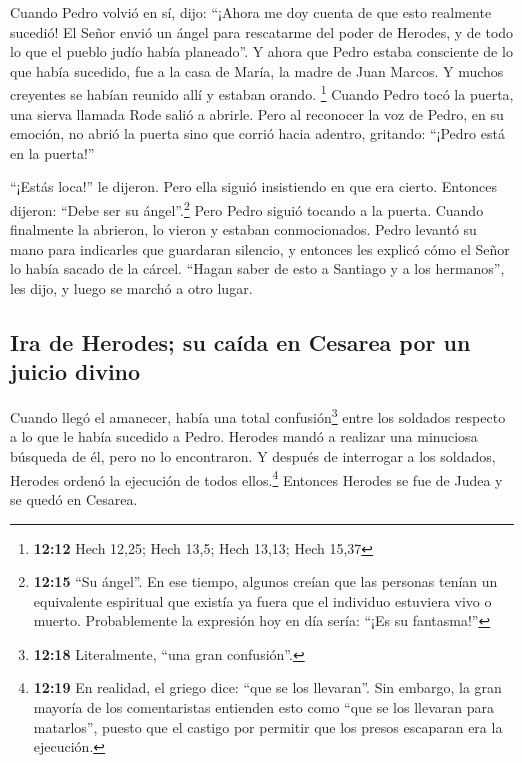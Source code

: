  Cuando Pedro volvió en sí, dijo: ``¡Ahora me doy cuenta
de que esto realmente sucedió! El Señor envió un ángel para rescatarme
del poder de Herodes, y de todo lo que el pueblo judío había planeado''.
 Y ahora que Pedro estaba consciente de lo que había
sucedido, fue a la casa de María, la madre de Juan Marcos. Y muchos
creyentes se habían reunido allí y estaban orando. \footnote{\textbf{12:12}
  Hech 12,25; Hech 13,5; Hech 13,13; Hech 15,37}  Cuando
Pedro tocó la puerta, una sierva llamada Rode salió a abrirle.
 Pero al reconocer la voz de Pedro, en su emoción, no
abrió la puerta sino que corrió hacia adentro, gritando: ``¡Pedro está
en la puerta!''

 ``¡Estás loca!'' le dijeron. Pero ella siguió
insistiendo en que era cierto. Entonces dijeron: ``Debe ser su
ángel''.\footnote{\textbf{12:15} ``Su ángel''. En ese tiempo, algunos
  creían que las personas tenían un equivalente espiritual que existía
  ya fuera que el individuo estuviera vivo o muerto. Probablemente la
  expresión hoy en día sería: ``¡Es su fantasma!''}  Pero
Pedro siguió tocando a la puerta. Cuando finalmente la abrieron, lo
vieron y estaban conmocionados.  Pedro levantó su mano
para indicarles que guardaran silencio, y entonces les explicó cómo el
Señor lo había sacado de la cárcel. ``Hagan saber de esto a Santiago y a
los hermanos'', les dijo, y luego se marchó a otro lugar.

\hypertarget{ira-de-herodes-su-cauxedda-en-cesarea-por-un-juicio-divino}{%
\subsection{Ira de Herodes; su caída en Cesarea por un juicio
divino}\label{ira-de-herodes-su-cauxedda-en-cesarea-por-un-juicio-divino}}

 Cuando llegó el amanecer, había una total
confusión\footnote{\textbf{12:18} Literalmente, ``una gran confusión''.}
entre los soldados respecto a lo que le había sucedido a Pedro.
 Herodes mandó a realizar una minuciosa búsqueda de él,
pero no lo encontraron. Y después de interrogar a los soldados, Herodes
ordenó la ejecución de todos ellos.\footnote{\textbf{12:19} En realidad,
  el griego dice: ``que se los llevaran''. Sin embargo, la gran mayoría
  de los comentaristas entienden esto como ``que se los llevaran para
  matarlos'', puesto que el castigo por permitir que los presos
  escaparan era la ejecución.} Entonces Herodes se fue de Judea y se
quedó en Cesarea.

